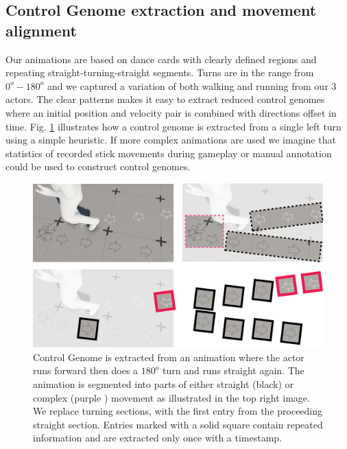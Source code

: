 \subsection{Control Genome extraction and movement alignment}
Our animations are based on dance cards with clearly defined regions and repeating straight-turning-straight segments. Turns are in the range from $0^o-180^o$ and we captured a variation of both walking and running from our 3 actors. The clear patterns makes it easy to extract reduced control genomes where an initial position and velocity pair is combined with directions offset in time. Fig. \ref{fig:results:genome_extraction} illustrates how a control genome is extracted from a single left turn using a simple heuristic. If more complex animations are used we imagine that statistics of recorded stick movements during gameplay or manual annotation could be used to construct control genomes. 
\begin{figure}
    \centering
    \includegraphics[width=1.0\columnwidth]{img/genome_extract.png}
    \caption{Control Genome is extracted from an animation where the actor runs forward then does a $180^o$ turn and runs straight again. The animation is segmented into parts of either straight (black) or complex (purple ) movement as illustrated in the top right image. We replace turning sections, with the first entry from the proceeding straight section. Entries marked with a solid square contain repeated information and are extracted only once with a timestamp.}
    \label{fig:results:genome_extraction}
\end{figure}

